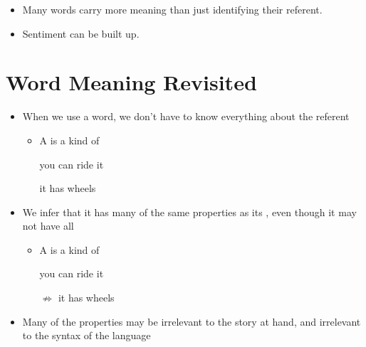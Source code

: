 \documentclass[a4paper,landscape,headrule,footrule,xetex]{foils}
\begin{document}

\begin{itemize}
\item Many words carry more meaning than just identifying their referent.
\begin{exe}
  \ex
  \begin{xlist}
    \ex {}
    \ex {}
    \ex {}
  \end{xlist}
\end{exe}
\item Sentiment can be built up.
  \begin{exe}
    \ex {}
    \ex {}
    \ex {}
    \ex {}
  \end{exe}
\end{itemize}



\section{Word Meaning Revisited}


\begin{itemize}
\item When we use a word, we don't have to know everything about the
  referent
  \begin{itemize}
  \item A  is a kind of 
  \item[\ent] you can ride it
  \item[\ent] it has wheels
  \end{itemize}
\item We infer that it has many of the same properties as its
  , even though it may not have all
 \begin{itemize}
  \item A  is a kind of 
  \item[\ent] you can ride it
  \item[$\not\Rightarrow$] it has wheels
  \end{itemize}
\item Many of the properties may be irrelevant to the story at hand,
  and irrelevant to the syntax of the language
\end{itemize}

\end{document}
